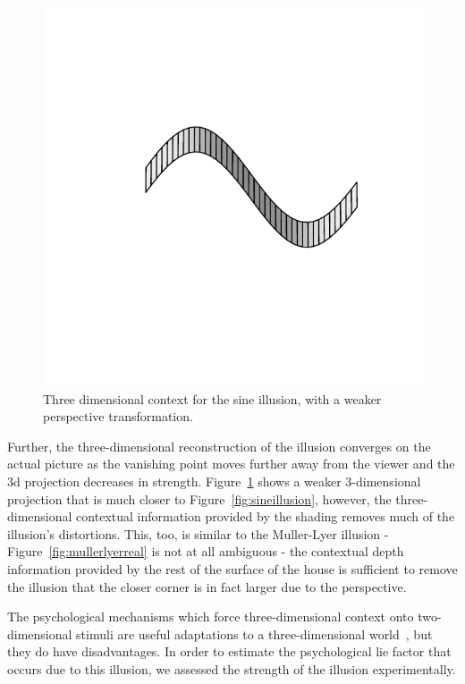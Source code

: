 \documentclass[journal]{vgtc}\usepackage{graphicx, color}
\begin{document}
\begin{figure}[h!t]\centering
\includegraphics[keepaspectratio=TRUE,width=\linewidth, trim=0in 1.5in 0in 1.5in]{figure/fig-sinedemo3}
\caption{Three dimensional context for the sine illusion, with a weaker perspective transformation.}\label{fig:sineillusion3dmagic}
\end{figure}


Further, the three-dimensional reconstruction of the illusion converges on the actual picture as the vanishing point moves further away from the viewer and the 3d projection decreases in strength. Figure~\ref{fig:sineillusion3dmagic} shows a weaker 3-dimensional projection that is much closer to Figure~\ref{fig:sineillusion}, however, the three-dimensional contextual information provided by the shading removes much of the illusion's distortions. This, too, is similar to the Muller-Lyer illusion - Figure~\ref{fig:mullerlyerreal} is not at all ambiguous - the contextual depth information provided by the rest of the surface of the house is sufficient to remove the illusion that the closer corner is in fact larger due to the perspective.

The psychological mechanisms which force three-dimensional context onto two-dimensional stimuli are useful adaptations to a three-dimensional world~\citep{gregory}, but they do have disadvantages. In order to estimate the psychological lie factor that occurs due to this illusion, we assessed the strength of the illusion experimentally. 
\end{document}
